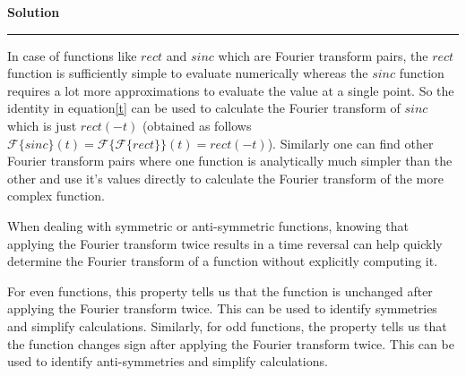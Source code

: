 \documentclass[a4paper]{article}
\newenvironment{solution}[2][]{%
    \begin{mdframed}[linecolor=green!60!black, linewidth=2pt, roundcorner=10pt, backgroundcolor=green!5!white, skipabove=12pt, skipbelow=12pt]%
        \textbf{\large #2} %
        \par\noindent\rule{\textwidth}{0.4pt} %
        \vspace{0.5em} %
}{%
    \end{mdframed}%
}
\begin{document}
\begin{solution}{Solution}
    In case of functions like $rect$ and $sinc$ which are Fourier transform pairs, the $rect$ function is sufficiently simple
    to evaluate numerically whereas the $sinc$ function requires a lot more approximations to evaluate the value at a single
    point. So the identity in equation\ref{t} can be used to calculate the Fourier transform of $sinc$ which is 
    just $rect(-t)$ (obtained as follows $\mathcal{F}\{sinc\}(t) = \mathcal{F}\{\mathcal{F}\{rect\}\}(t) = rect(-t)$). Similarly
    one can find other Fourier transform pairs where one function is analytically much simpler than the other and use it's
    values directly to calculate the Fourier transform of the more complex function.


    When dealing with symmetric or anti-symmetric functions, knowing that applying the Fourier transform twice results in a time reversal can help quickly determine the Fourier transform of a function without explicitly computing it.


    For even functions, this property tells us that the function is unchanged after applying the Fourier transform twice. This can be used to identify symmetries and simplify calculations. Similarly, for odd functions, the property tells us that the function changes sign after applying the Fourier transform twice. This can be used to identify anti-symmetries and simplify calculations.
\end{solution}
\end{document}
